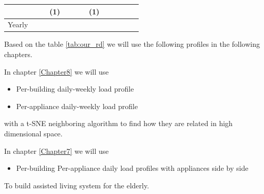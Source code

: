 \begin{table}[H]
\begin{tabular}{|l|cccc|cccc|cccc|}
      \multicolumn{1}{c|}{} &
      \multicolumn{1}{c|}{} &
      \multicolumn{1}{c|}{} &
      (1) &
      \multicolumn{1}{c|}{} &
      \multicolumn{1}{c|}{} &
      \multicolumn{1}{c|}{} &
      (1) &
      \multicolumn{1}{c|}{} &
      \multicolumn{1}{c|}{} &
      \multicolumn{1}{c|}{} &
       \\ \hline
    Yearly &
      \multicolumn{1}{c|}{} &
      \multicolumn{1}{c|}{} &
      \multicolumn{1}{c|}{} &
       &
      \multicolumn{1}{c|}{} &
      \multicolumn{1}{c|}{} &
      \multicolumn{1}{c|}{} &
       &
      \multicolumn{1}{c|}{} &
      \multicolumn{1}{c|}{} &
      \multicolumn{1}{c|}{} &
       \\ \hline
    \end{tabular}
    \end{table}


Based on the table \ref{tab:our_rd} we will use the following profiles in the following chapters.

In chapter \ref{Chapter8} we will use 
\begin{itemize}
  \item Per-building daily-weekly load profile
  \item Per-appliance daily-weekly load profile
\end{itemize}

with a t-SNE neighboring algorithm to find how they are related in high dimensional space.

In chapter \ref{Chapter7} we will use
\begin{itemize}
  \item Per-building Per-appliance daily load profiles with appliances side by side
\end{itemize}
To build assisted living system for the elderly.

